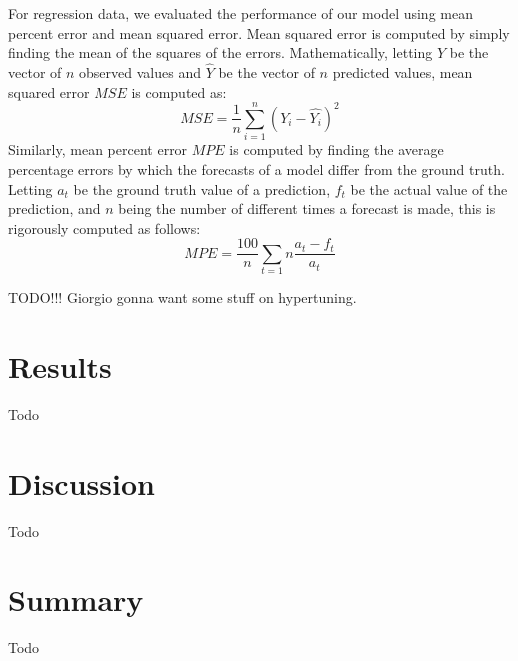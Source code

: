 \documentclass[twoside,11pt]{article}
\begin{document}
For regression data, we evaluated the performance of our model using mean percent error and mean squared error. Mean squared error is computed by
simply finding the mean of the squares of the errors. Mathematically, letting $Y$ be the vector of $n$ observed values and $\hat{Y}$ be the vector of $n$ predicted
values, mean squared error $MSE$ is computed as:
\begin{equation}
MSE = \frac{1}{n} \sum_{i=1}^{n} (Y_i - \hat{Y_i})^2
\end{equation}
Similarly, mean percent error $MPE$ is computed by finding the average percentage errors by which the forecasts of a model differ from the ground truth. Letting $a_t$ be the 
ground truth value of a prediction, $f_t$ be the actual value of the prediction, and $n$ being the number of different times a forecast is made, this is rigorously
computed as follows:
\begin{equation}
MPE = \frac{100}{n} \sum_{t=1}{n} \frac{a_t - f_t}{a_t}
\end{equation}

TODO!!! Giorgio gonna want some stuff on hypertuning.


\section{Results}
Todo

\section{Discussion}
Todo


\section{Summary}
Todo
\end{document}
